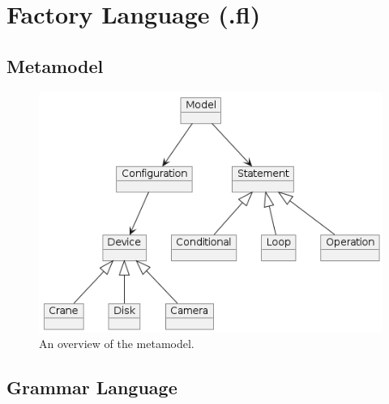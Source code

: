 
\section{Factory Language (.fl)}\label{appendix:factory-lang}

\subsection{Metamodel}\label{appendix:metamodel} 

\begin{figure}[H]
    \centering
    \includegraphics[width=.40\textwidth]{Image/metamodel-final.png}
    \caption{An overview of the metamodel.}
    \label{fig:metamodel}
\end{figure}

\subsection{Grammar Language}\label{appendix:grammar-language}

